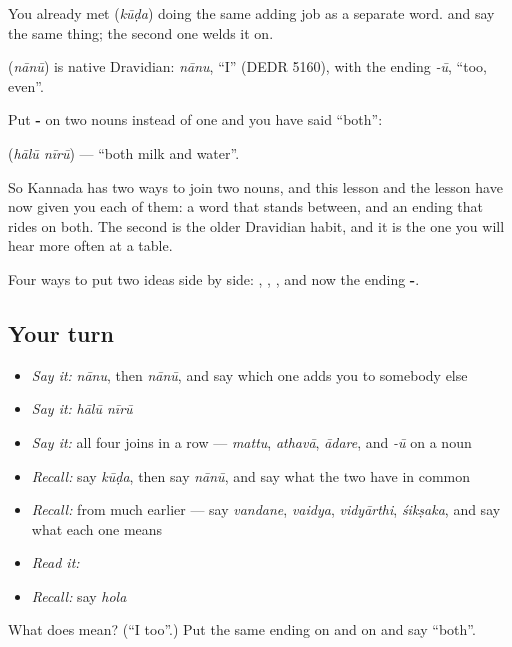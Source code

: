 You already met  (\emph{kūḍa}) doing the same adding job as a separate word.   and  say the same thing; the second one welds it on.

\begin{cousinweb}
\textbf{} (\emph{nānū}) is native Dravidian: \emph{nānu}, \textquotedblleft{}I\textquotedblright{} (DEDR 5160), with the ending \emph{-ū}, \textquotedblleft{}too, even\textquotedblright{}.
\end{cousinweb}

\begin{grammarlens}[title={Grammar Lens: the same ending on two nouns means both}]
Put \textbf{-} on two nouns instead of one and you have said \textquotedblleft{}both\textquotedblright{}:

\textbf{ } (\emph{hālū nīrū}) — \textquotedblleft{}both milk and water\textquotedblright{}.

So Kannada has two ways to join two nouns, and this lesson and the  lesson have now given you each of them: a word that stands between, and an ending that rides on both. The second is the older Dravidian habit, and it is the one you will hear more often at a table.
\end{grammarlens}

\begin{grammarlens}[title={What you've built}]
Four ways to put two ideas side by side: , , , and now the ending \textbf{-}.
\end{grammarlens}

\subsection*{Your turn}
\begin{itemize}
\raggedright
  \item \emph{Say it:} \emph{nānu}, then \emph{nānū}, and say which one adds you to somebody else
  \item \emph{Say it:} \emph{hālū nīrū}
  \item \emph{Say it:} all four joins in a row — \emph{mattu}, \emph{athavā}, \emph{ādare}, and \emph{-ū} on a noun
  \item \emph{Recall:} say \emph{kūḍa}, then say \emph{nānū}, and say what the two have in common
  \item \emph{Recall:} from much earlier — say \emph{vandane}, \emph{vaidya}, \emph{vidyārthi}, \emph{śikṣaka}, and say what each one means
  \item \emph{Read it:} \textbf{}
  \item \emph{Recall:} say \emph{hola}
\end{itemize}

\begin{tcolorbox}[breakable,colback=teal!4,colframe=teal!35!black,title={Before you move on}]
What does  mean? (\textquotedblleft{}I too\textquotedblright{}.) Put the same ending on  and on  and say \textquotedblleft{}both\textquotedblright{}.
\end{tcolorbox}

